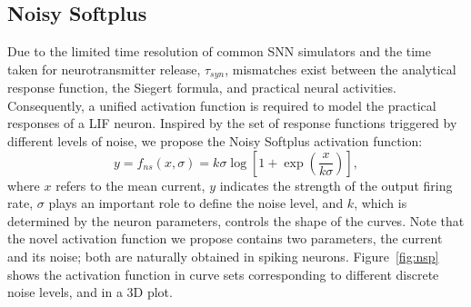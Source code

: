 	\subsection{Noisy Softplus}
	Due to the limited time resolution of common SNN simulators and the time taken for neurotransmitter release, $\tau_{syn}$, mismatches exist between the analytical response function, the Siegert formula, and practical neural activities.
	Consequently, a unified activation function is required to model the practical responses of a LIF neuron.
	Inspired by the set of response functions triggered by different levels of noise, we propose the Noisy Softplus activation function:
	\begin{equation}
	y = f_{ns}(x, \sigma) = k \sigma \log [1 + \exp(\frac{x}{k \sigma})],
	\label{equ:nsp}
	\end{equation}
	where $x$ refers to the mean current, $y$ indicates the strength of the output firing rate, $\sigma$ plays an important role to define the noise level, and $k$, which is determined by the neuron parameters, controls the shape of the curves.
	Note that the novel activation function we propose contains two parameters, the current and its noise; both are naturally obtained in spiking neurons.
	Figure~\ref{fig:nsp} shows the activation function in curve sets corresponding to different discrete noise levels, and in a 3D plot.
